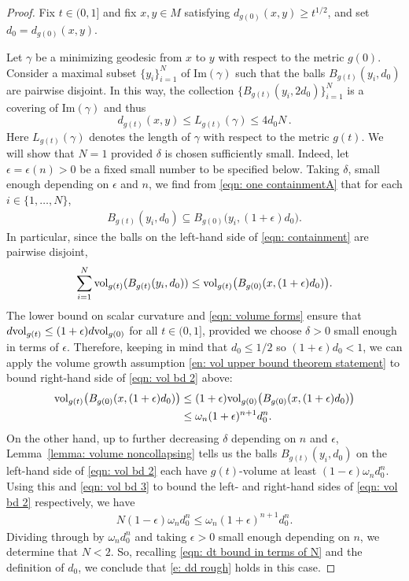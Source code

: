 \documentclass[11pt,reqno]{amsart}
\theoremstyle{remark}
\theoremstyle{definition}
\numberwithin{equation}{section}
\newcommand{\e}{{\epsilon}}
\newcommand{\om}{\omega}
\newcommand{\vol}{{\rm{vol}}}
\begin{document}
\begin{proof}
Fix $t \in (0,1]$ and fix $x,y\in M$ satisfying $d_{g(0)}(x, y) \geq t^{1 / 2}$, and set 
$d_0 = d_{g(0)}(x,y )$.\smallskip
	
 Let $\gamma$ be a minimizing geodesic from $x$ to $y$ with respect to the metric $g(0)$. Consider a maximal subset $\{y_i\}_{i=1}^N$ of $\text{Im}(\gamma)$ such that the balls $B_{g(t)}(y_i, d_0)$ are pairwise disjoint. In this way, the collection $\{ B_{g(t)}(y_i,2d_0)\}_{i=1}^N$ is a covering of $\text{Im}(\gamma)$ and thus
\begin{equation}\label{eqn: dt bound in terms of N}
	d_{g(t)}(x,y) \leq L_{g(t)}(\gamma) \leq 4d_0N\,.
\end{equation}	
Here $L_{g(t)}(\gamma)$ denotes the length of $\gamma$ with respect to the metric $g(t)$.
We will show that $N=1$ provided $\delta$ is chosen sufficiently small. Indeed, let $\e=\e(n)>0$ be a fixed small number to be specified below. Taking $\delta$, small enough depending on $\e$ and $n$,   we find from \eqref{eqn: one containmentA} that for each $i \in \{1,\dots, N\}$,
\begin{align}\label{eqn: containment}
	B_{g(t)}(y_i, d_0) \subseteq B_{g(0)}\big(y_i, (1+ \e)d_0\big) .
\end{align}
In particular, since the balls on the left-hand side of \eqref{eqn: containment} are pairwise disjoint,
\begin{equation}\label{eqn: vol bd 2}
	\sum_{i=1}^N \vol_{g(t)}(B_{g(t)}(y_i, d_0)) \leq \vol_{g(t)}\big(B_{g(0)}(x,(1+\e)d_0)\big).
\end{equation}
The lower bound on scalar curvature and \eqref{eqn: volume forms} ensure that 
$ d\vol_{g(t)}\leq (1+\e) d\vol_{g(0)}$ for all $t \in (0,1]$, provided we choose $\delta>0$ small enough in terms of $\e$.
 Therefore, keeping in mind that $d_0\leq 1/2$ so $(1+\e)d_0<1$, we can apply the volume growth assumption \eqref{en: vol upper bound theorem statement} to bound right-hand side of \eqref{eqn: vol bd 2} above:
 \begin{equation}\label{eqn: vol bd 3}
 \begin{split}
 	\vol_{g(t)} \big(B_{g(0)}(x,(1+\e) d_0)\big)
 	& \leq (1+\e) \vol_{g(0)}\big(B_{g(0)}(x,(1+ \e)d_0)\big)\\ & \leq \om_n(1+ \e)^{n+1} d_0^n.
 \end{split}
 \end{equation}
On the other hand, up to further decreasing  $\delta$ depending on $n$ and $\e$,  Lemma~\ref{lemma: volume noncollapsing} tells us the balls $B_{g(t)}(y_i, d_0)$ on the left-hand side of \eqref{eqn: vol bd 2} each have $g(t)$-volume at least $(1-\e) \om_n d_0^n$. 
Using this and \eqref{eqn: vol bd 3} to bound the left- and right-hand sides of \eqref{eqn: vol bd 2} respectively, we have
\begin{align*}
	 N (1-\e) \om_n  d_0^n \leq \om_n (1+\e)^{n+1}d_0^n.  
\end{align*} 
Dividing through by $\omega_n d_0^n$ and taking $\e>0$ small enough depending on $n$, we determine that $N<2.$ So, recalling \eqref{eqn: dt bound in terms of N} and the definition of $d_0$, we conclude that \eqref{e: dd rough} holds in this case.\smallskip


\end{proof}
\end{document}
